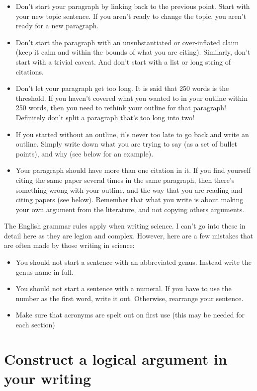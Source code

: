 \documentclass[
]{krantz}
\providecommand{\tightlist}{%
  \setlength{\itemsep}{0pt}\setlength{\parskip}{0pt}}
\begin{document}
\begin{itemize}
\tightlist
\item
  Don't start your paragraph by linking back to the previous point. Start with your new topic sentence. If you aren't ready to change the topic, you aren't ready for a new paragraph.
\item
  Don't start the paragraph with an unsubstantiated or over-inflated claim (keep it calm and within the bounds of what you are citing). Similarly, don't start with a trivial caveat. And don't start with a list or long string of citations.
\item
  Don't let your paragraph get too long. It is said that 250 words is the threshold. If you haven't covered what you wanted to in your outline within 250 words, then you need to rethink your outline for that paragraph! Definitely don't split a paragraph that's too long into two!
\item
  If you started without an outline, it's never too late to go back and write an outline. Simply write down what you are trying to say (as a set of bullet points), and why (see below for an example).
\item
  Your paragraph should have more than one citation in it. If you find yourself citing the same paper several times in the same paragraph, then there's something wrong with your outline, and the way that you are reading and citing papers (see below). Remember that what you write is about making your own argument from the literature, and not copying others arguments.
\end{itemize}

The English grammar rules apply when writing science. I can't go into these in detail here as they are legion and complex. However, here are a few mistakes that are often made by those writing in science:

\begin{itemize}
\tightlist
\item
  You should not start a sentence with an abbreviated genus. Instead write the genus name in full.
\item
  You should not start a sentence with a numeral. If you have to use the number as the first word, write it out. Otherwise, rearrange your sentence.
\item
  Make sure that acronyms are spelt out on first use (this may be needed for each section)
\end{itemize}

\hypertarget{argument}{%
\section{Construct a logical argument in your writing}\label{argument}}
\end{document}
